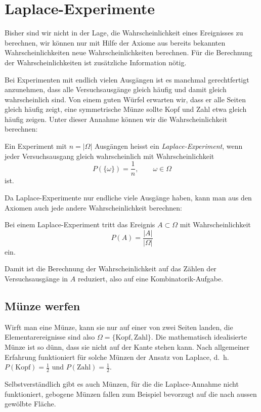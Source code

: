 \section{Laplace-Experimente}
\label{section-laplace-ereignisse}
Bisher sind wir nicht in der Lage, die Wahrscheinlichkeit eines Ereignisses
zu berechnen, wir können nur mit Hilfe der Axiome aus bereits bekannten
Wahrscheinlichkeiten neue Wahrscheinlichkeiten berechnen.
Für die Berechnung der Wahrscheinlichkeiten ist zusätzliche
Information nötig.

Bei Experimenten mit endlich vielen Ausgängen ist es manchmal gerechtfertigt
anzunehmen, dass alle Versuchsausgänge gleich häufig und damit gleich
wahrscheinlich sind.
Von einem guten Würfel erwarten wir, dass er alle Seiten gleich häufig
zeigt, eine symmetrische Münze sollte Kopf und Zahl etwa gleich häufig
zeigen.
Unter dieser Annahme können wir die Wahrscheinlichkeit berechnen:

\begin{definition}
Ein Experiment mit $n=|\Omega|$ Ausgängen heisst ein {\em Laplace-Experiment},
wenn jeder Versuchsausgang gleich wahrscheinlich mit Wahrscheinlichkeit
\[
P(\{\omega\})=\frac1n,\qquad\omega\in\Omega
\]
ist.
\end{definition}

Da Laplace-Experimente nur endliche viele Ausgänge haben, kann man aus
den Axiomen auch jede andere Wahrscheinlichkeit berechnen:

\begin{satz}
Bei einem Laplace-Experiment tritt das Ereignis $A\subset\Omega$ mit
Wahrscheinlichkeit
\[
P(A)=\frac{|A|}{|\Omega|}
\]
ein.
\end{satz}
Damit ist die Berechnung der Wahrscheinlichkeit auf das Zählen der 
Versuchsausgänge in $A$ reduziert, also auf eine Kombinatorik-Aufgabe.

\subsection{Münze werfen}
Wirft man eine Münze, kann sie nur auf einer von zwei Seiten landen,
die Elementarereignisse sind also $\Omega = \{\text{Kopf}, \text{Zahl}\}$.
Die mathematisch idealisierte Münze ist so dünn, dass sie nicht auf
der Kante stehen kann.
Nach allgemeiner Erfahrung funktioniert für
solche Münzen der Ansatz von Laplace, d.~h.~$P(\text{Kopf}) = \frac12$
und $P(\text{Zahl})=\frac12$.

Selbstverständlich gibt es auch Münzen, für die die Laplace-Annahme
nicht funktioniert, gebogene Münzen fallen zum Beispiel bevorzugt auf die
nach aussen gewölbte Fläche.

